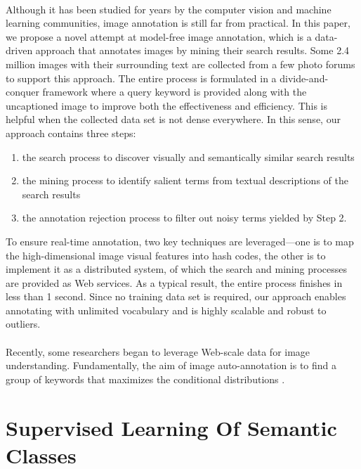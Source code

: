 \documentclass[a4paper,11pt]{report}
\begin{document}
\paragraph{}
Although it has been studied for years by the computer vision and machine learning communities, image annotation is still far from practical. In this paper, we propose a novel attempt at model-free image annotation, which is a data-driven approach that annotates images by mining their search results. Some 2.4 million images with their surrounding text are collected from a few photo forums to support this approach. The entire process is formulated in a divide-and-conquer framework where a query keyword is provided along with the uncaptioned image to improve both the effectiveness and efficiency. This is helpful when the collected data set is not dense everywhere. In this sense, our approach contains three steps:
\begin{enumerate}
\item the search process to discover visually and semantically similar search results
\item the mining process to identify salient terms from textual descriptions of the search results 
\item the annotation rejection process to filter out noisy terms yielded by Step 2. 
\end{enumerate}
  
To ensure real-time annotation, two key techniques are leveraged—one is to map the high-dimensional image visual features into hash codes, the other is to implement it as a distributed system, of which the search and mining processes are provided as Web services. As a typical result, the entire process finishes in less than 1 second. Since no training data set is required, our approach enables annotating with unlimited vocabulary and is highly scalable
and robust to outliers.
\paragraph{} Recently, some researchers began to leverage Web-scale data for image understanding. Fundamentally, the aim of image auto-annotation is to find a group of keywords  that maximizes the conditional distributions .
\section{Supervised Learning Of Semantic Classes}
\end{document}
